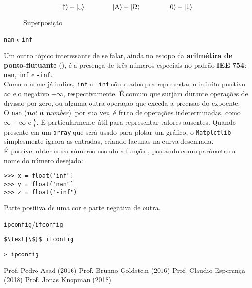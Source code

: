 \documentclass[12pt]{article}
\begin{document}
	\begin{figure}[H]
		\centering\Large
		$$ \left|\uparrow\right\rangle  +  \left|\downarrow\right\rangle  \hspace{40pt}  \left|\text{A}\right\rangle  +  \left|\Omega\right\rangle  \hspace{40pt}  \left|0\right\rangle  +  \left|1\right\rangle $$
	\caption{Superposição}
	\end{figure}
	
	
	
	\begin{interlude}{\texttt{nan} e \texttt{inf}}
	
	Um outro tópico interessante de se falar, ainda no escopo da \textbf{aritmética de ponto-flutuante} (), é a presença de três números especiais no padrão \textbf{IEE 754}: \texttt{nan}, \texttt{inf} e \texttt{-inf}.\\
	
	Como o nome já indica, \texttt{inf} e \texttt{-inf} são usados pra representar o infinito positivo $\infty$ e o negativo $-\infty$, respectivamente. É comum que surjam durante operações de divisão por zero, ou alguma outra operação que exceda a precisão do expoente.\\
	
	O \texttt{nan} (\textit{\textbf{n}ot \textbf{a} \textbf{n}umber}), por sua vez, é fruto de operações indeterminadas, como $\infty - \infty$ e $\frac{0}{0}$. É particularmente útil para representar valores ausentes. Quando presente em um \texttt{array} que será usado para plotar um gráfico, o \texttt{Matplotlib} simplesmente ignora as entradas, criando lacunas na curva desenhada.\\
	
	É possível obter esses números usando a função , passando como parâmetro o nome do número desejado:
	
	\begin{lstlisting}[caption='\texttt{nan} e \texttt{inf}']
>>> x = float("inf")
>>> y = float("nan")
>>> z = float("-inf")
	\end{lstlisting}
	
	\end{interlude}
	
	
	Parte positiva de uma cor e parte negativa de outra.	
	
	
	
	\begin{interlude}{\texttt{ipconfig}/\texttt{ifconfig}}
	
	\begin{lstlisting}
$\text{\$}$ ifconfig
	\end{lstlisting}
	
	\begin{lstlisting}
> ipconfig
	\end{lstlisting}	
	
	\end{interlude}
	
	\begin{thebibliography}{99}
	 Prof. Pedro Asad (2016)
	 Prof. Brunno Goldstein (2016)
	 Prof. Claudio Esperança (2018)
	 Prof. Jonas Knopman (2018)
	\end{thebibliography}
\end{document}
